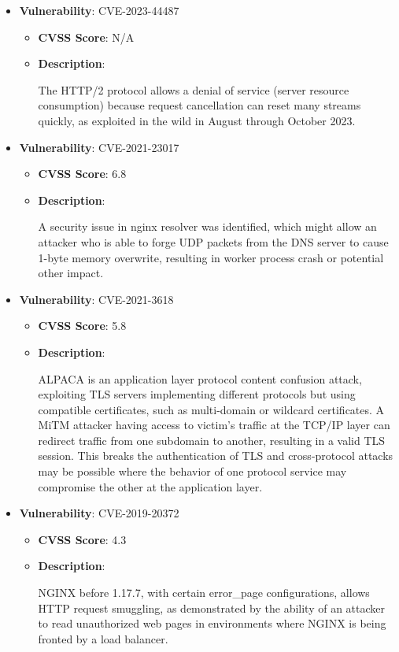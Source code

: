 \documentclass{article}
\begin{document}
\begin{itemize}
    
        \item \textbf{Vulnerability}: CVE-2023-44487
        \begin{itemize}
            \item \textbf{CVSS Score}:  N/A 
            \item \textbf{Description}:
            \parbox[t]{0.9\linewidth}{
                \ttfamily The HTTP/2 protocol allows a denial of service (server resource consumption) because request cancellation can reset many streams quickly, as exploited in the wild in August through October 2023.
            }
        \end{itemize}
    
        \item \textbf{Vulnerability}: CVE-2021-23017
        \begin{itemize}
            \item \textbf{CVSS Score}:  6.8 
            \item \textbf{Description}:
            \parbox[t]{0.9\linewidth}{
                \ttfamily A security issue in nginx resolver was identified, which might allow an attacker who is able to forge UDP packets from the DNS server to cause 1-byte memory overwrite, resulting in worker process crash or potential other impact.
            }
        \end{itemize}
    
        \item \textbf{Vulnerability}: CVE-2021-3618
        \begin{itemize}
            \item \textbf{CVSS Score}:  5.8 
            \item \textbf{Description}:
            \parbox[t]{0.9\linewidth}{
                \ttfamily ALPACA is an application layer protocol content confusion attack, exploiting TLS servers implementing different protocols but using compatible certificates, such as multi-domain or wildcard certificates. A MiTM attacker having access to victim's traffic at the TCP/IP layer can redirect traffic from one subdomain to another, resulting in a valid TLS session. This breaks the authentication of TLS and cross-protocol attacks may be possible where the behavior of one protocol service may compromise the other at the application layer.
            }
        \end{itemize}
    
        \item \textbf{Vulnerability}: CVE-2019-20372
        \begin{itemize}
            \item \textbf{CVSS Score}:  4.3 
            \item \textbf{Description}:
            \parbox[t]{0.9\linewidth}{
                \ttfamily NGINX before 1.17.7, with certain error\_page configurations, allows HTTP request smuggling, as demonstrated by the ability of an attacker to read unauthorized web pages in environments where NGINX is being fronted by a load balancer.
            }
        \end{itemize}
    

\end{itemize}
\end{document}
